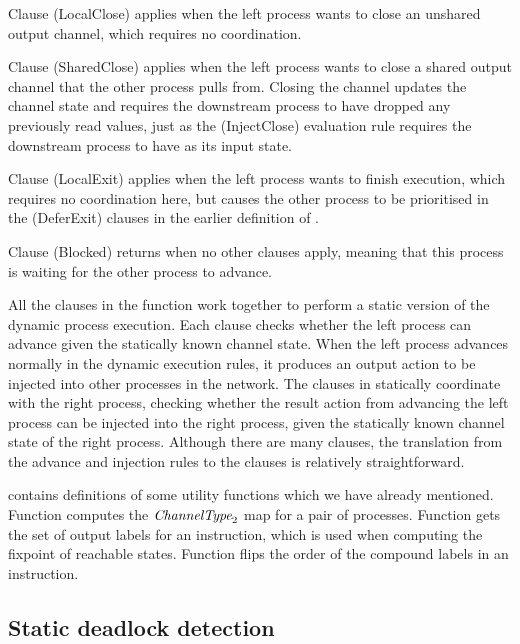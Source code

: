 Clause (LocalClose) applies when the left process wants to close an unshared output channel, which requires no coordination.

Clause (SharedClose) applies when the left process wants to close a shared output channel that the other process pulls from.
Closing the channel updates the channel state and requires the downstream process to have dropped any previously read values, just as the (InjectClose) evaluation rule requires the downstream process to have \lstiproc@none@ as its input state.

Clause (LocalExit) applies when the left process wants to finish execution, which requires no coordination here, but causes the other process to be prioritised in the (DeferExit) clauses in the earlier definition of .

Clause (Blocked) returns \lstiproc@Nothing@ when no other clauses apply, meaning that this process is waiting for the other process to advance.

All the clauses in the  function work together to perform a static version of the dynamic process execution.
Each clause checks whether the left process can advance given the statically known channel state.
When the left process advances normally in the dynamic execution rules, it produces an output action to be injected into other processes in the network.
The clauses in  statically coordinate with the right process, checking whether the result action from advancing the left process can be injected into the right process, given the statically known channel state of the right process.
Although there are many clauses, the translation from the advance and injection rules to the clauses is relatively straightforward.

\smallskip



 contains definitions of some utility functions which we have already mentioned.
Function  computes the $\textit{ChannelType}_2$ map for a pair of processes.
Function  gets the set of output labels for an instruction, which is used when computing the fixpoint of reachable states.
Function  flips the order of the compound labels in an instruction.

\subsection{Static deadlock detection}

